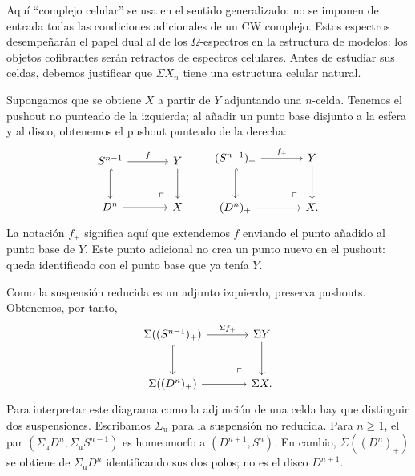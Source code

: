 Aquí ``complejo celular'' se usa en el sentido generalizado: no se imponen de entrada todas las condiciones adicionales de un CW complejo. Estos espectros desempeñarán el papel dual al de los $\Omega$-espectros en la estructura de modelos: los objetos cofibrantes serán retractos de espectros celulares. Antes de estudiar sus celdas, debemos justificar que $\Sigma X_n$ tiene una estructura celular natural.

Supongamos que se obtiene $X$ a partir de $Y$ adjuntando una $n$-celda. Tenemos el pushout no punteado de la izquierda; al añadir un punto base disjunto a la esfera y al disco, obtenemos el pushout punteado de la derecha:
\[
\begin{tikzcd}[column sep=large,row sep=large]
S^{n-1} \arrow[r,"f"] \arrow[d,hook]
& Y \arrow[d]\\
D^n \arrow[r] & X \arrow[ul,phantom,"\ulcorner",very near start]
\end{tikzcd}
\qquad
\begin{tikzcd}[column sep=large,row sep=large]
(S^{n-1})_+ \arrow[r,"f_+"] \arrow[d,hook]
& Y \arrow[d]\\
(D^n)_+ \arrow[r] & X \arrow[ul,phantom,"\ulcorner",very near start].
\end{tikzcd}
\]
La notación $f_+$ significa aquí que extendemos $f$ enviando el punto añadido al punto base de $Y$. Este punto adicional no crea un punto nuevo en el pushout: queda identificado con el punto base que ya tenía $Y$.

Como la suspensión reducida es un adjunto izquierdo, preserva pushouts. Obtenemos, por tanto,
\[
\begin{tikzcd}[column sep=large,row sep=large]
\Sigma((S^{n-1})_+) \arrow[r,"\Sigma f_+"] \arrow[d,hook]
& \Sigma Y \arrow[d]\\
\Sigma((D^n)_+) \arrow[r]
& \Sigma X \arrow[ul,phantom,"\ulcorner",very near start].
\end{tikzcd}
\]
Para interpretar este diagrama como la adjunción de una celda hay que distinguir dos suspensiones. Escribamos $\Sigma_{\mathrm u}$ para la suspensión no reducida. Para $n\ge1$, el par $(\Sigma_{\mathrm u}D^n,\Sigma_{\mathrm u}S^{n-1})$ es homeomorfo a $(D^{n+1},S^n)$. En cambio, $\Sigma((D^n)_+)$ se obtiene de $\Sigma_{\mathrm u}D^n$ identificando sus dos polos; no es el disco $D^{n+1}$.

